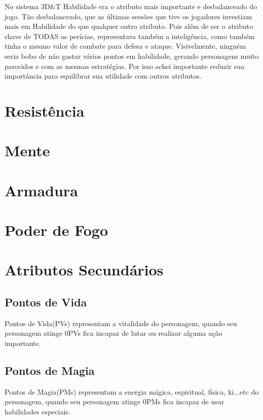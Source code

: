 \begin{framed}
No sistema 3D\&T Habilidade era o atributo mais importante e desbalanceado do jogo. Tão desbalanceado, que as últimas sessões que tive os jogadores investiam mais em Habilidade do que qualquer outro atributo. Pois além de ser o atributo chave de TODAS as perícias, representava também a inteligência, como também tinha o mesmo valor de combate para defesa e ataque. Visivelmente, ninguém seria bobo de não gastar vários pontos em habilidade, gerando personagens muito parecidos e com as mesmas estratégias. Por isso achei importante reduzir sua importância para equilibrar sua utilidade com outros atributos.
\end{framed}

\section{Resistência}

\section{Mente}

\section{Armadura}

\section{Poder de Fogo}

\section{Atributos Secundários}

\subsection{Pontos de Vida}

Pontos de Vida(PVs) representam a vitalidade do personagem, quando seu personagem atinge 0PVs fica incapaz de lutar ou realizar alguma ação importante.

\subsection{Pontos de Magia}

Pontos de Magia(PMs) representam a energia mágica, espiritual, física, ki...etc do personagem, quando seu personagem atinge 0PMs fica incapaz de usar habilidades especiais.

